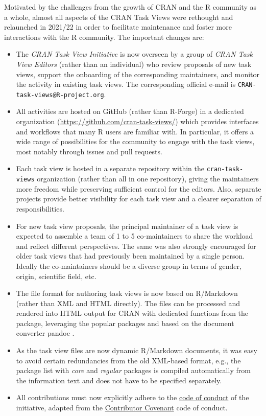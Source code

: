 Motivated by the challenges from the growth of CRAN and the R community as a whole,
almost all aspects of the CRAN Task Views were rethought and relaunched in 2021/22
in order to facilitate maintenance and foster more interactions with the R community.
The important changes are:

\begin{itemize}
\tightlist
\item
  The \emph{CRAN Task View Initiative} is now overseen by a group of \emph{CRAN Task View Editors}
  (rather than an individual)
  who review proposals of new task views, support the onboarding of the corresponding
  maintainers, and monitor the activity in existing task views. The corresponding
  official e-mail is \texttt{CRAN-task-views@R-project.org}.
\item
  All activities are hosted on GitHub (rather than R-Forge) in a dedicated organization
  (\url{https://github.com/cran-task-views/}) which provides interfaces and workflows that
  many R users are familiar with. In particular, it offers a wide range of possibilities
  for the community to engage with the task views, most notably through issues and
  pull requests.
\item
  Each task view is hosted in a separate repository within the \texttt{cran-task-views}
  organization (rather than all in one repository), giving the maintainers more freedom
  while preserving sufficient control for the editors. Also, separate projects
  provide better visibility for each task view and a clearer separation of responsibilities.
\item
  For new task view proposals, the principal maintainer of a task view is expected to assemble
  a team of 1 to 5 co-maintainers to share the workload and reflect different perspectives. The
  same was also strongly encouraged for older task views that had previously been maintained by a single
  person. Ideally the co-maintainers should be a diverse group in terms of gender,
  origin, scientific field, etc.
\item
  The file format for authoring task views is now based on R/Markdown (rather than XML
  and HTML directly). The files can be processed and rendered into HTML output for CRAN
  with dedicated functions from the  package, leveraging the popular packages
   \citep{knitr} and  \citep{rmarkdown} based on the document
  converter pandoc \citep{pandoc}.
\item
  As the task view files are now dynamic R/Markdown documents, it was easy to avoid
  certain redundancies from the old XML-based format, e.g., the package list with \emph{core}
  and \emph{regular} packages is compiled automatically from the information text and does
  not have to be specified separately.
\item
  All contributions must now explicitly adhere to the
  \href{https://github.com/cran-task-views/ctv/blob/main/CodeOfConduct.md}{code of conduct}
  of the initiative, adapted from the \href{https://www.contributor-covenant.org/}{Contributor Covenant}
  code of conduct.
\end{itemize}


